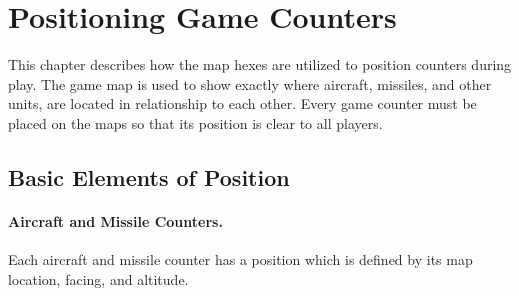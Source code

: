 \section{Positioning Game Counters}

This chapter describes how the map hexes are utilized to position counters during play. The game map is used to show exactly where aircraft, missiles, and other units, are located in relationship to each other. Every game counter must be placed on the maps so that its position is clear to all players.

\subsection{Basic Elements of Position}

\paragraph{Aircraft and Missile Counters.} Each aircraft and missile counter has a position which is defined by its map location, facing, and altitude.

